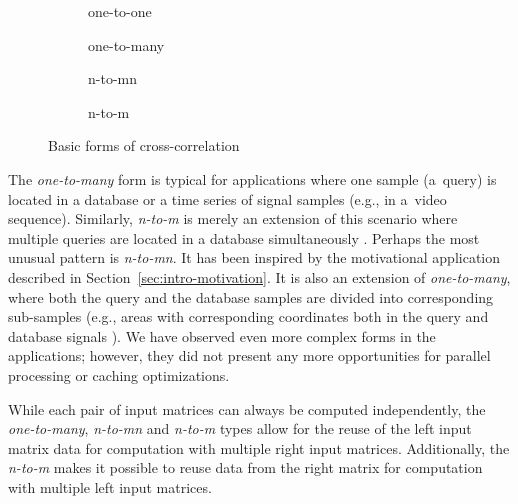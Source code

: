 \begin{figure}[h]
	\centering
	\begin{subfigure}{0.4\textwidth}
		\centering
		\def\svgwidth{0.5\textwidth}
		
		\caption{one-to-one}
		\label{fig:cross_corr_one_to_one}
	\end{subfigure}
	\hfill
	\begin{subfigure}{0.4\textwidth}
		\centering
		\def\svgwidth{0.5\textwidth}
		
		\caption{one-to-many}
		\label{fig:cross_corr_one_to_many}
	\end{subfigure}
	\hfill
	\begin{subfigure}{0.4\textwidth}
		\centering
		\def\svgwidth{0.7\textwidth}
		
		\caption{n-to-mn}
		\label{fig:cross_corr_n_to_mn}
	\end{subfigure}
	\hfill
	\begin{subfigure}{0.4\textwidth}
		\centering
		\def\svgwidth{0.7\textwidth}
		
		\caption{n-to-m}
		\label{fig:cross_corr_n_to_m}
	\end{subfigure}
	
	\caption{Basic forms of cross-correlation}
	\label{fig:cross_corr_forms}
\end{figure}

The \textit{one-to-many} form is typical for applications where one sample (a~query) is located in a database or a time series of signal samples (e.g., in a~video sequence). Similarly, \textit{n-to-m} is merely an extension of this scenario where multiple queries are located in a database simultaneously \cite{Clark2011}. Perhaps the most unusual pattern is \textit{n-to-mn}. It has been inspired by the motivational application described in Section~\ref{sec:intro-motivation}. It is also an extension of \textit{one-to-many}, where both the query and the database samples are divided into corresponding sub-samples (e.g., areas with corresponding coordinates both in the query and database signals \cite{Kapinchev2015,zhang2015}). We have observed even more complex forms in the applications; however, they did not present any more opportunities for parallel processing or caching optimizations.

While each pair of input matrices can always be computed independently, the \textit{one-to-many}, \textit{n-to-mn} and \textit{n-to-m} types allow for the reuse of the left input matrix data for computation with multiple right input matrices. Additionally, the \textit{n-to-m} makes it possible to reuse data from the right matrix for computation with multiple left input matrices. 


